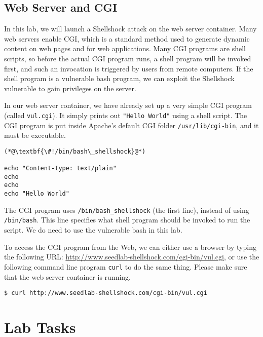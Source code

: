 \subsection{Web Server and CGI}

In this lab, we will launch a Shellshock attack on the web server container. 
Many web servers enable CGI, which is a standard method used to generate
dynamic content on web pages and for web applications. Many CGI programs are
shell scripts, so before the actual CGI program runs,
a shell program will be invoked first, and such an invocation is
triggered by users from remote computers. If the shell program is
a vulnerable bash program, we can exploit the Shellshock vulnerable to
gain privileges on the server.


In our web server container, we have already set up a very simple CGI
program (called \texttt{vul.cgi}). 
It simply prints out {\tt "Hello World"} using a shell script.
The CGI program is put inside Apache's default CGI folder \texttt{/usr/lib/cgi-bin},
and it must be executable. 

\begin{lstlisting}[caption=\texttt{vul.cgi}] 
(*@\textbf{\#!/bin/bash\_shellshock}@*)          

echo "Content-type: text/plain"
echo
echo
echo "Hello World"
\end{lstlisting}

The CGI program uses \texttt{/bin/bash\_shellshock} (the first line),
instead of using \texttt{/bin/bash}. This line specifies
what shell program should be invoked to run the script. We do need to use
the vulnerable bash in this lab.


To access the CGI program from the Web, we can either use a browser by
typing the following URL: \url{http://www.seedlab-shellshock.com/cgi-bin/vul.cgi}, 
or use the following command line program {\tt curl} to do the same thing. Please 
make sure that the web server container is running.

\begin{lstlisting}
$ curl http://www.seedlab-shellshock.com/cgi-bin/vul.cgi
\end{lstlisting}


\section{Lab Tasks}

